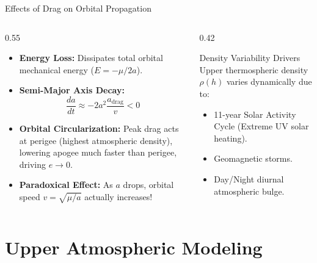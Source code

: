 \documentclass[aspectratio=169,11pt]{beamer}
\begin{document}
\begin{frame}{Effects of Drag on Orbital Propagation}
    \begin{columns}
        \begin{column}{0.55\textwidth}
            \begin{itemize}
                \item \textbf{Energy Loss:} Dissipates total orbital mechanical energy ($E = -\mu / 2a$).
                \item \textbf{Semi-Major Axis Decay:}
                $$\frac{da}{dt} \approx -2 a^2 \frac{a_{\text{drag}}}{v} < 0$$
                \item \textbf{Orbital Circularization:} Peak drag acts at perigee (highest atmospheric density), lowering apogee much faster than perigee, driving $e \to 0$.
                \item \textbf{Paradoxical Effect:} As $a$ drops, orbital speed $v = \sqrt{\mu/a}$ actually increases!
            \end{itemize}
        \end{column}
        
        \begin{column}{0.42\textwidth}
            \begin{block}{Density Variability Drivers}
                Upper thermospheric density $\rho(h)$ varies dynamically due to:
                \begin{itemize}
                    \item 11-year Solar Activity Cycle (Extreme UV solar heating).
                    \item Geomagnetic storms.
                    \item Day/Night diurnal atmospheric bulge.
                \end{itemize}
            \end{block}
        \end{column}
    \end{columns}
\end{frame}

\section{Upper Atmospheric Modeling}
\end{document}
